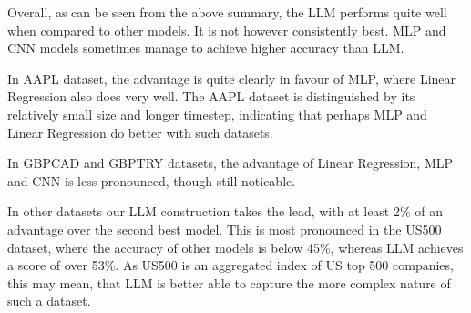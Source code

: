 Overall, as can be seen from the above summary, the LLM performs quite well when compared to other models. It is not however consistently best. MLP and CNN models sometimes manage to achieve higher accuracy than LLM.

In AAPL dataset, the advantage is quite clearly in favour of MLP, where Linear Regression also does very well. The AAPL dataset is distinguished by its relatively small size and longer timestep, indicating that perhaps MLP and Linear Regression do better with such datasets.

In GBPCAD and GBPTRY datasets, the advantage of Linear Regression, MLP and CNN is less pronounced, though still noticable.

In other datasets our LLM construction takes the lead, with at least 2\% of an advantage over the second best model. This is most pronounced in the US500 dataset, where the accuracy of other models is below 45\%, whereas LLM achieves a score of over 53\%. As US500 is an aggregated index of US top 500 companies, this may mean, that LLM is better able to capture the more complex nature of such a dataset.
\\[100pt]

